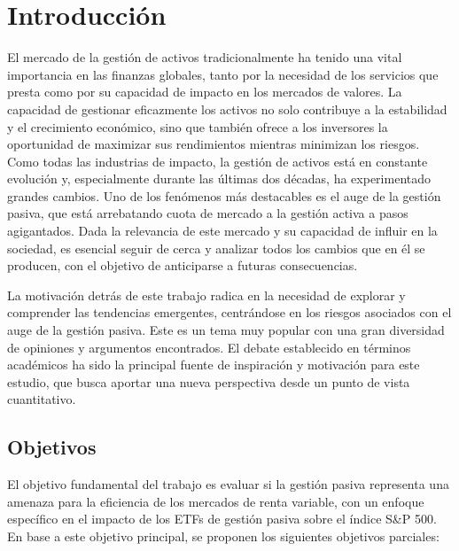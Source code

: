 \documentclass[12pt,a4paper]{article}
\begin{document}
\newpage

\section{Introducción}

El mercado de la gestión de activos tradicionalmente ha tenido una vital importancia en las finanzas globales, tanto por la necesidad de los servicios que presta como por su capacidad de impacto en los mercados de valores. La capacidad de gestionar eficazmente los activos no solo contribuye a la estabilidad y el crecimiento económico, sino que también ofrece a los inversores la oportunidad de maximizar sus rendimientos mientras minimizan los riesgos. Como todas las industrias de impacto, la gestión de activos está en constante evolución y, especialmente durante las últimas dos décadas, ha experimentado grandes cambios. Uno de los fenómenos más destacables es el auge de la gestión pasiva, que está arrebatando cuota de mercado a la gestión activa a pasos agigantados. Dada la relevancia de este mercado y su capacidad de influir en la sociedad, es esencial seguir de cerca y analizar todos los cambios que en él se producen, con el objetivo de anticiparse a futuras consecuencias.

La motivación detrás de este trabajo radica en la necesidad de explorar y comprender las tendencias emergentes, centrándose en los riesgos asociados con el auge de la gestión pasiva. Este es un tema muy popular con una gran diversidad de opiniones y argumentos encontrados. El debate establecido en términos académicos ha sido la principal fuente de inspiración y motivación para este estudio, que busca aportar una nueva perspectiva desde un punto de vista cuantitativo.

\subsection*{Objetivos}

El objetivo fundamental del trabajo es evaluar si la gestión pasiva representa una amenaza para la eficiencia de los mercados de renta variable, con un enfoque específico en el impacto de los ETFs de gestión pasiva sobre el índice S\&P 500. En base a este objetivo principal, se proponen los siguientes objetivos parciales:
\end{document}
